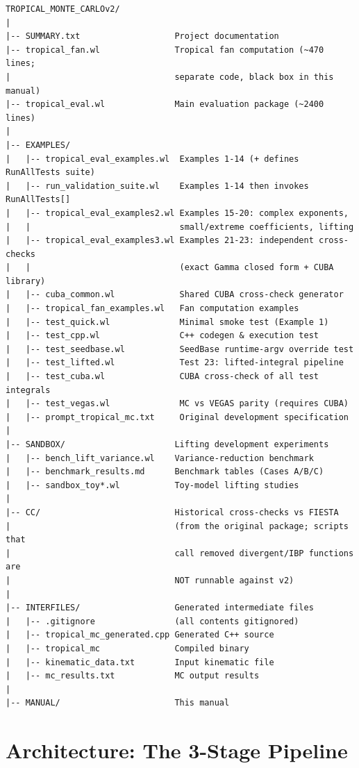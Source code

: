 \documentclass[11pt,a4paper]{article}
\begin{document}
\begin{lstlisting}
TROPICAL_MONTE_CARLOv2/
|
|-- SUMMARY.txt                   Project documentation
|-- tropical_fan.wl               Tropical fan computation (~470 lines;
|                                 separate code, black box in this manual)
|-- tropical_eval.wl              Main evaluation package (~2400 lines)
|
|-- EXAMPLES/
|   |-- tropical_eval_examples.wl  Examples 1-14 (+ defines RunAllTests suite)
|   |-- run_validation_suite.wl    Examples 1-14 then invokes RunAllTests[]
|   |-- tropical_eval_examples2.wl Examples 15-20: complex exponents,
|   |                              small/extreme coefficients, lifting
|   |-- tropical_eval_examples3.wl Examples 21-23: independent cross-checks
|   |                              (exact Gamma closed form + CUBA library)
|   |-- cuba_common.wl             Shared CUBA cross-check generator
|   |-- tropical_fan_examples.wl   Fan computation examples
|   |-- test_quick.wl              Minimal smoke test (Example 1)
|   |-- test_cpp.wl                C++ codegen & execution test
|   |-- test_seedbase.wl           SeedBase runtime-argv override test
|   |-- test_lifted.wl             Test 23: lifted-integral pipeline
|   |-- test_cuba.wl               CUBA cross-check of all test integrals
|   |-- test_vegas.wl              MC vs VEGAS parity (requires CUBA)
|   |-- prompt_tropical_mc.txt     Original development specification
|
|-- SANDBOX/                      Lifting development experiments
|   |-- bench_lift_variance.wl    Variance-reduction benchmark
|   |-- benchmark_results.md      Benchmark tables (Cases A/B/C)
|   |-- sandbox_toy*.wl           Toy-model lifting studies
|
|-- CC/                           Historical cross-checks vs FIESTA
|                                 (from the original package; scripts that
|                                 call removed divergent/IBP functions are
|                                 NOT runnable against v2)
|
|-- INTERFILES/                   Generated intermediate files
|   |-- .gitignore                (all contents gitignored)
|   |-- tropical_mc_generated.cpp Generated C++ source
|   |-- tropical_mc               Compiled binary
|   |-- kinematic_data.txt        Input kinematic file
|   |-- mc_results.txt            MC output results
|
|-- MANUAL/                       This manual
\end{lstlisting}

\section{Architecture: The 3-Stage Pipeline}
\end{document}
